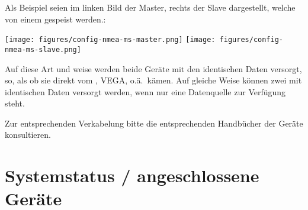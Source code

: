 Als Beispiel seien im linken Bild der Master, rechts der Slave dargestellt, welche von einem \fl gespeist werden.:


\begin{center}%
\texttt{[image: figures/config-nmea-ms-master.png]}\quad
\texttt{[image: figures/config-nmea-ms-slave.png]}
\end{center}

%



Auf diese Art und weise werden beide Geräte mit den identischen Daten versorgt, so, als ob sie direkt vom \fl, VEGA, o.ä.\ kämen. 
Auf gleiche Weise können zwei \al mit identischen Daten versorgt werden, wenn nur eine Datenquelle zur Verfügung steht.

Zur entsprechenden Verkabelung bitte die entsprechenden Handbücher der Geräte konsultieren.

\section{Systemstatus / angeschlossene Geräte}\label{sec:system-status-dialog}

